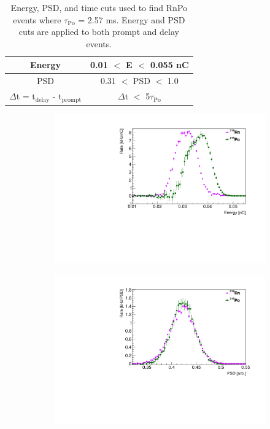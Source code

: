\begin{table}[H]
	\centering
	\begin{tabular}{c|c}
		\hline 
		Energy & 0.01 $<$ E $<$ 0.055 nC \\ 
		\hline 
		PSD & 0.31 $<$ PSD $<$ 1.0  \\ 
		\hline 
		$\Delta$t = t$_{\mathrm{delay}}$ - t$_{\mathrm{prompt}}$ & $\Delta$t $<$ 5$\tau_{\textrm{Po}}$ \\ 
		\hline 
	\end{tabular} 
	\caption{Energy, PSD, and time cuts used to find RnPo events where $\tau_{\textrm{Po}}$ = 2.57 ms. Energy and PSD cuts are applied to both prompt and delay events.}
	\label{tab:MatCuts}
\end{table}

\begin{figure}[H]
	\centering
	\begin{subfigure}{0.5\linewidth}
		\centering
		\includegraphics[width=1.\linewidth]{"tex/6-ac227-images/BNL/RnPoEn_TimeBin23_S2"}
		\caption{}
	\end{subfigure}%
	\begin{subfigure}{0.5\linewidth}
		\centering
		\includegraphics[width=1.\linewidth]{"tex/6-ac227-images/BNL/RnPoPSD_TimeBin23_S2"}

\end{subfigure}
\end{figure}
